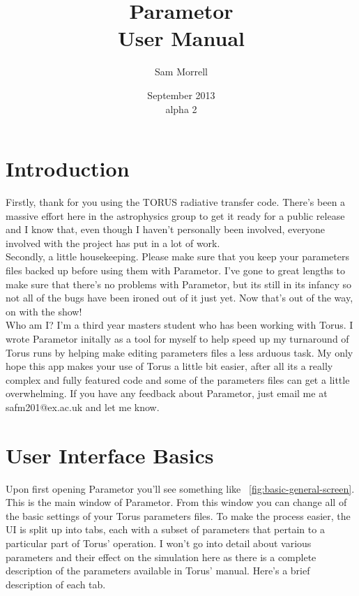 \documentclass[a4paper,10pt]{article}
\newcommand{\figref}[2][\figurename~]{#1\ref{#2}}
\begin{document}
\title{Parametor\\User Manual} %
\author{Sam Morrell}%
\date{September 2013\\alpha 2} %
\maketitle %

\tableofcontents
\newpage

\section{Introduction}
Firstly, thank for you using the TORUS radiative transfer code. There's been a massive effort here in the astrophysics group to get it ready for a public release and I know that, even though I haven't personally been involved, everyone involved with the project has put in a lot of work. \\
Secondly, a little housekeeping. Please make sure that you keep your parameters files backed up before using them with Parametor. I've gone to great lengths to make sure that there's no problems with Parametor, but its still in its infancy so not all of the bugs have been ironed out of it just yet. Now that's out of the way, on with the show!\\
Who am I? I'm a third year masters student who has been working with Torus. I wrote Parametor initally as a tool for myself to help speed up my turnaround of Torus runs by helping make editing parameters files a less arduous task. My only hope this app makes your use of Torus a little bit easier, after all its a really complex and fully featured code and some of the parameters files can get a little overwhelming. If you have any feedback about Parametor, just email me at safm201@ex.ac.uk and let me know.


\section{User Interface Basics}
Upon first opening Parametor you'll see something like \figref{fig:basic-general-screen}. This is the main window of Parametor. From this window you can change all of the basic settings of your Torus parameters files. To make the process easier, the UI is split up into tabs, each with a subset of parameters that pertain to a particular part of Torus' operation. I won't go into detail about various parameters and their effect on the simulation here as there is a complete description of the parameters available in Torus' manual. Here's a brief description of each tab.
\end{document}
